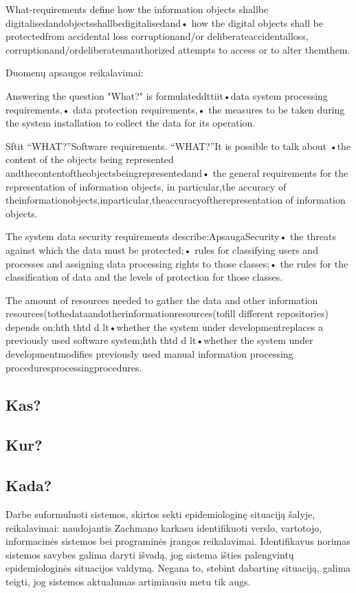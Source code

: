 \documentclass{VUMIFPSkursinis}
\begin{document}
What-requirements define how the information objects shallbe digitalisedandobjectsshallbedigitalisedand•  how the digital objects shall be protectedfrom accidental loss  corruptionand/or deliberateaccidentalloss, corruptionand/ordeliberateunauthorized attempts to access or to alter themthem.

Duomenų apsaugos reikalavimai: 

Answering the question "What?" is formulateddttiit•data system processing requirements,•  data protection requirements,•  the measures to be taken during the system installation to collect the data for its operation.

Sftit  “WHAT?”Software requirements. “WHAT?”It is possible to talk about •the content of the objects being represented andthecontentoftheobjectsbeingrepresentedand•   the general requirements for the representation of information objects, in particular,the accuracy of theinformationobjects,inparticular,theaccuracyoftherepresentation of information objects.

The system data security requirements describe:ApsaugaSecurity•   the threats against which the data must be protected;•   rules for classifying users and processes and assigning data processing rights to those classes;•   the rules for the classification of data and the levels of protection for those classes.

The amount of resources needed to gather the data and other information resources(tothedataandotherinformationresources(tofill different repositories) depends on:hth  thtd  d    lt•whether the system under developmentreplaces a previously used software system;hth  thtd  d    lt•whether the system under developmentmodifies previously used manual information processing proceduresprocessingprocedures.

\subsection{Kas?}\label{sec:PSReqWho}
\subsection{Kur?}\label{sec:PSReqWhere}
\subsection{Kada?}\label{sec:PSReqWhen}

Darbe suformuluoti sistemos, skirtos sekti epidemiologinę situaciją šalyje, 
reikalavimai: naudojantis Zachmano karkasu identifikuoti verslo, vartotojo,
informacinės sistemos bei programinės įrangos reikalavimai. Identifikavus norimas
sistemos savybes galima daryti išvadą, jog sistema išties palengvintų epidemiologinės
situacijos valdymą. Negana to, stebint dabartinę situaciją, galima teigti, jog sistemos 
aktualumas artimiausiu metu tik augs.
\end{document}
